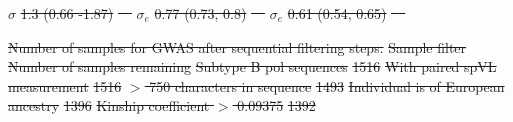 \documentclass[12pt]{article} %
\providecommand{\DIFdel}[1]{{\protect\color{red}\sout{#1}}}                      %
\providecommand{\DIFdelFL}[1]{\DIFdel{#1}} %
\begin{document}
\DIFdelFL{$\sigma$ }%
\DIFdelFL{1.3 (0.66 -1.87) }%
\DIFdelFL{\mbox{%
\citet{Blanquart2017} }\hskip0pt%
}%
\DIFdelFL{$\sigma_e$ }%
\DIFdelFL{0.77 (0.73, 0.8) }%
\DIFdelFL{\mbox{%
\citet{Mitov2018} }\hskip0pt%
}%
\DIFdelFL{$\sigma_e$ }%
\DIFdelFL{0.61 (0.54, 0.65) }%
\DIFdelFL{\mbox{%
\citet{Blanquart2017} }\hskip0pt%
}%

{%
\DIFdelFL{Number of samples for GWAS after sequential filtering steps.}}
\DIFdelFL{Sample filter }%
\DIFdelFL{Number of samples remaining }%
\DIFdelFL{Subtype B pol sequences }%
\DIFdelFL{1516 }%
\DIFdelFL{With paired spVL measurement }%
\DIFdelFL{1516 }%
\DIFdelFL{$>$ 750 characters in sequence }%
\DIFdelFL{1493 }%
\DIFdelFL{Individual is of European ancestry }%
\DIFdelFL{1396 }%
\DIFdelFL{Kinship coefficient $>$ 0.09375 }%
\DIFdelFL{1392 }%
\end{document}
